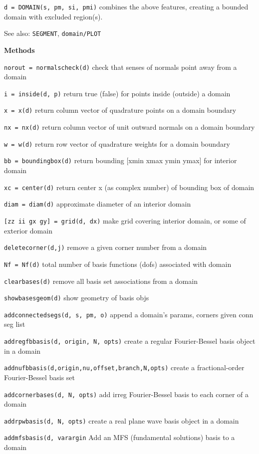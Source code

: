 {\tt d = DOMAIN(s, pm, si, pmi)} combines the above features, creating a bounded
domain with excluded region(s).

See also: {\tt SEGMENT}, {\tt domain/PLOT}

\textbf{Methods}

{\tt norout = normalscheck(d)} check that senses of normals point
away from a domain

{\tt i = inside(d, p)} return true (false) for points inside
(outside) a domain

{\tt x = x(d)} return column vector of quadrature points on a domain boundary

{\tt nx = nx(d)} return column vector of unit outward normals on a
domain boundary

{\tt w = w(d)} return row vector of quadrature weights for a domain
boundary

{\tt bb = boundingbox(d)} return bounding [xmin xmax ymin ymax] for
interior domain

{\tt xc = center(d)} return center x (as complex number) of bounding
box of domain 

{\tt diam = diam(d)} approximate diameter of an interior domain

{\tt [zz ii gx gy] = grid(d, dx)} make grid covering interior
domain, or some of exterior domain

{\tt deletecorner(d,j)} remove a given corner number from a domain

{\tt Nf = Nf(d)} total number of basis functions (dofs) associated
with domain

{\tt clearbases(d)} remove all basis set associations from a domain

{\tt showbasesgeom(d)} show geometry of basis objs

{\tt addconnectedsegs(d, s, pm, o)} append a domain's params,
corners given conn seg list

{\tt addregfbbasis(d, origin, N, opts)} create a regular
Fourier-Bessel basis object in a domain

{\tt addnufbbasis(d,origin,nu,offset,branch,N,opts)} create a
fractional-order Fourier-Bessel basis set

{\tt addcornerbases(d, N, opts)} add irreg Fourier-Bessel basis to
each corner of a domain

{\tt addrpwbasis(d, N, opts)} create a real plane wave basis object
in a domain

{\tt addmfsbasis(d, varargin} Add an MFS (fundamental solutions)
basis to a domain

